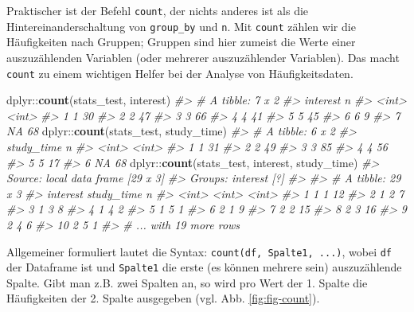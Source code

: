 \documentclass[12pt,ngerman,]{book}
\makeatletter
\newenvironment{Shaded}{\begin{snugshade}}{\end{snugshade}}
\newcommand{\KeywordTok}[1]{\textcolor[rgb]{0.13,0.29,0.53}{\textbf{{#1}}}}
\newcommand{\CommentTok}[1]{\textcolor[rgb]{0.56,0.35,0.01}{\textit{{#1}}}}
\newcommand{\NormalTok}[1]{{#1}}
\newenvironment{kframe}{%
\medskip{}
\setlength{\fboxsep}{.8em}
 \def\at@end@of@kframe{}%
 \ifinner\ifhmode%
  \def\at@end@of@kframe{\end{minipage}}%
  \begin{minipage}{\columnwidth}%
 \fi\fi%
 \def\FrameCommand##1{\hskip\@totalleftmargin \hskip-\fboxsep
 \colorbox{shadecolor}{##1}\hskip-\fboxsep
     \hskip-\linewidth \hskip-\@totalleftmargin \hskip\columnwidth}%
 \MakeFramed {\advance\hsize-\width
   \@totalleftmargin\z@ \linewidth\hsize
   \@setminipage}}%
 {\par\unskip\endMakeFramed%
 \at@end@of@kframe}
\renewenvironment{Shaded}{\begin{kframe}}{\end{kframe}}
\theoremstyle{definition}
\theoremstyle{definition}
\theoremstyle{remark}
\makeatother
\begin{document}
Praktischer ist der Befehl \texttt{count}, der
nichts anderes ist als die Hintereinanderschaltung von
\texttt{group\_by} und \texttt{n}. Mit \texttt{count} zählen wir die
Häufigkeiten nach Gruppen; Gruppen sind hier zumeist die Werte einer
auszuzählenden Variablen (oder mehrerer auszuzählender Variablen). Das
macht \texttt{count} zu einem wichtigen Helfer bei der Analyse von
Häufigkeitsdaten.

\begin{Shaded}
\begin{Highlighting}[]
\NormalTok{dplyr::}\KeywordTok{count}\NormalTok{(stats_test, interest)}
\CommentTok{#> # A tibble: 7 x 2}
\CommentTok{#>   interest     n}
\CommentTok{#>      <int> <int>}
\CommentTok{#> 1        1    30}
\CommentTok{#> 2        2    47}
\CommentTok{#> 3        3    66}
\CommentTok{#> 4        4    41}
\CommentTok{#> 5        5    45}
\CommentTok{#> 6        6     9}
\CommentTok{#> 7       NA    68}
\NormalTok{dplyr::}\KeywordTok{count}\NormalTok{(stats_test, study_time)}
\CommentTok{#> # A tibble: 6 x 2}
\CommentTok{#>   study_time     n}
\CommentTok{#>        <int> <int>}
\CommentTok{#> 1          1    31}
\CommentTok{#> 2          2    49}
\CommentTok{#> 3          3    85}
\CommentTok{#> 4          4    56}
\CommentTok{#> 5          5    17}
\CommentTok{#> 6         NA    68}
\NormalTok{dplyr::}\KeywordTok{count}\NormalTok{(stats_test, interest, study_time)}
\CommentTok{#> Source: local data frame [29 x 3]}
\CommentTok{#> Groups: interest [?]}
\CommentTok{#> }
\CommentTok{#> # A tibble: 29 x 3}
\CommentTok{#>    interest study_time     n}
\CommentTok{#>       <int>      <int> <int>}
\CommentTok{#>  1        1          1    12}
\CommentTok{#>  2        1          2     7}
\CommentTok{#>  3        1          3     8}
\CommentTok{#>  4        1          4     2}
\CommentTok{#>  5        1          5     1}
\CommentTok{#>  6        2          1     9}
\CommentTok{#>  7        2          2    15}
\CommentTok{#>  8        2          3    16}
\CommentTok{#>  9        2          4     6}
\CommentTok{#> 10        2          5     1}
\CommentTok{#> # ... with 19 more rows}
\end{Highlighting}
\end{Shaded}

Allgemeiner formuliert lautet die Syntax:
\texttt{count(df,\ Spalte1,\ ...)}, wobei \texttt{df} der Dataframe ist
und \texttt{Spalte1} die erste (es können mehrere sein) auszuzählende
Spalte. Gibt man z.B. zwei Spalten an, so wird pro Wert der 1. Spalte
die Häufigkeiten der 2. Spalte ausgegeben (vgl. Abb.
\ref{fig:fig-count}).
\end{document}
